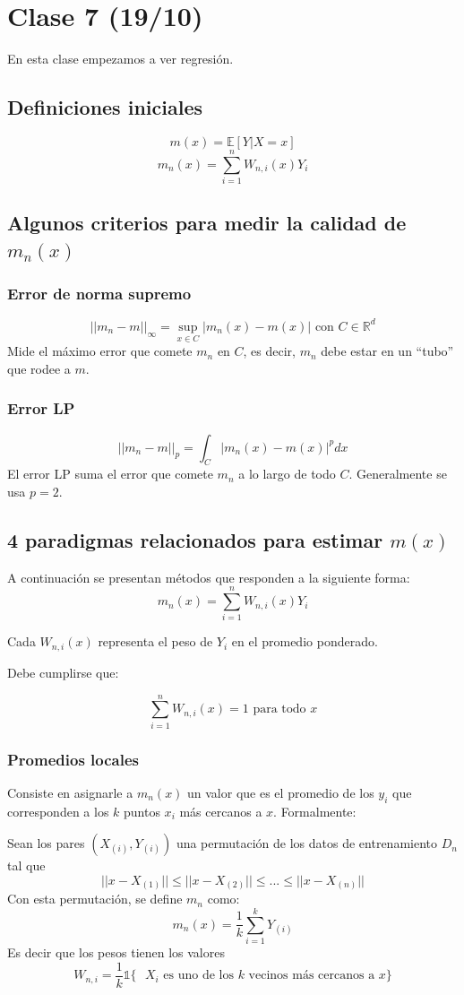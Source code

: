 \documentclass[12pt, a4paper]{article}
\begin{document}
\section{Clase 7 (19/10)}
En esta clase empezamos a ver regresión.
\subsection{Definiciones iniciales}
$$ m(x)=\mathds{E}[Y|X=x] $$
$$ m_n(x)=\sum_{i=1}^n W_{n,i}(x) Y_i $$
\subsection{Algunos criterios para medir la calidad de $m_n(x)$}
\subsubsection{Error de norma supremo}
$$ ||m_n - m||_{\infty} = \mathop{sup}_{x \in C} | m_n(x)-m(x)| \text{ con } C \in \mathds{R}^d $$
Mide el máximo error que comete $m_n$ en $C$, es decir, $m_n$ debe estar en un ``tubo'' que rodee a $m$.
\subsubsection{Error LP}
$$ ||m_n - m||_{p} = \int_{C} | m_n(x)-m(x)|^p dx $$
El error LP suma el error que comete $m_n$ a lo largo de todo $C$. Generalmente se usa $p=2$.
\subsection{4 paradigmas relacionados para estimar $m(x)$}
A continuación se presentan métodos que responden a la siguiente forma: $$ m_n(x)= \sum_{i=1}^n W_{n,i}(x) Y_i$$

Cada $W_{n,i}(x)$ representa el peso de $Y_i$ en el promedio ponderado.

Debe cumplirse que:

$$ \sum_{i=1}^n W_{n,i}(x) = 1 \text{ para todo $x$} $$
\subsubsection{Promedios locales}
Consiste en asignarle a $m_n(x)$ un valor que es el promedio de los $y_i$ que corresponden a los $k$ puntos $x_i$ más cercanos a $x$. Formalmente:

Sean los pares $(X_{(i)},Y_{(i)})$ una permutación de los datos de entrenamiento $D_n$ tal que $$ || x-X_{(1)} || \leq || x-X_{(2)} || \leq ... \leq || x - X_{(n)} || $$
Con esta permutación, se define $m_n$ como:
$$ m_n(x)= \frac{1}{k} \sum_{i=1}^k Y_{(i)}$$
Es decir que los pesos tienen los valores
$$ W_{n,i}=\frac{1}{k} \mathds{1} \big \{  \text{ $X_i$ es uno de los $k$ vecinos más cercanos a $x$} \big \}$$
\end{document}
